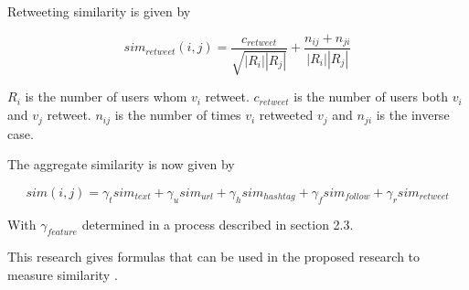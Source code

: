 Retweeting similarity is given by 

\begin{equation}
sim_{retweet}(i,j) = \frac{c_{retweet}}{\sqrt{\left|{R_i}\right|\left|{R_j}\right|}} + \frac{n_{ij} + n_{ji}}{\left|{R_i}\right|\left|{R_j}\right|}
\end{equation}

$R_i$ is the number of users whom $v_i$ retweet. $c_{retweet}$ is the number of users both $v_i$ and $v_j$ retweet. $n_{ij}$ is the number of times $v_i$ retweeted $v_j$ and $n_{ji}$ is the inverse case. 

The aggregate similarity is now given by

\begin{equation}
sim(i,j) = \gamma_t sim_{text} + \gamma_u sim_{url} + \gamma_h sim_{hashtag} + \gamma_f sim_{follow} + \gamma_r sim_{retweet}
\end{equation}

With $\gamma_{feature}$ determined in a process described in section 2.3.

This research gives formulas that can be used in the proposed research to measure similarity \cite{Zhang:2012}. 

